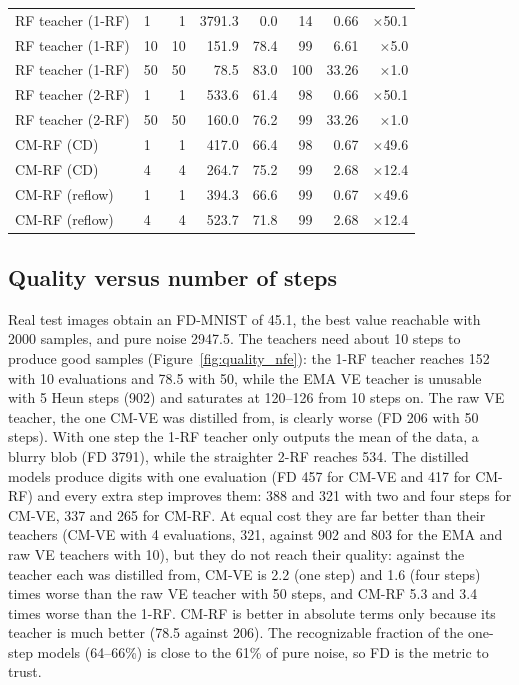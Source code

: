 \documentclass{article}
\begin{document}
\begin{table}[!htbp]
\begin{tabular}{llrrrrrr}
    RF teacher (1-RF) & 1 & 1 & 3791.3 & 0.0 & 14 & 0.66 & $\times$50.1 \\
    RF teacher (1-RF) & 10 & 10 & 151.9 & 78.4 & 99 & 6.61 & $\times$5.0 \\
    RF teacher (1-RF) & 50 & 50 & 78.5 & 83.0 & 100 & 33.26 & $\times$1.0 \\
    RF teacher (2-RF) & 1 & 1 & 533.6 & 61.4 & 98 & 0.66 & $\times$50.1 \\
    RF teacher (2-RF) & 50 & 50 & 160.0 & 76.2 & 99 & 33.26 & $\times$1.0 \\
    \midrule
    CM-RF (CD) & 1 & 1 & 417.0 & 66.4 & 98 & 0.67 & $\times$49.6 \\
    CM-RF (CD) & 4 & 4 & 264.7 & 75.2 & 99 & 2.68 & $\times$12.4 \\
    \midrule
    CM-RF (reflow) & 1 & 1 & 394.3 & 66.6 & 99 & 0.67 & $\times$49.6 \\
    CM-RF (reflow) & 4 & 4 & 523.7 & 71.8 & 99 & 2.68 & $\times$12.4 \\
    \bottomrule
  \end{tabular}
\end{table}

\subsection{Quality versus number of steps}

Real test images obtain an FD-MNIST of 45.1, the best value reachable with
2000 samples, and pure noise 2947.5. The teachers need about 10 steps to
produce good samples (Figure~\ref{fig:quality_nfe}): the 1-RF teacher reaches
152 with 10 evaluations and 78.5 with 50, while the EMA VE teacher is unusable
with 5 Heun steps (902) and saturates at 120--126 from 10 steps on. The raw VE
teacher, the one CM-VE was distilled from, is clearly worse (FD 206 with 50
steps). With one step the 1-RF teacher only outputs the mean of the data, a
blurry blob (FD 3791), while the straighter 2-RF reaches 534. The distilled
models produce digits with one evaluation (FD 457 for CM-VE and 417 for CM-RF)
and every extra step improves them: 388 and 321 with two and four steps for
CM-VE, 337 and 265 for CM-RF. At equal cost they are far better than their
teachers (CM-VE with 4 evaluations, 321, against 902 and 803 for the EMA and raw
VE teachers with 10), but they do not reach their quality: against the teacher
each was distilled from, CM-VE is 2.2 (one step) and 1.6 (four steps) times
worse than the raw VE teacher with 50 steps, and CM-RF 5.3 and 3.4 times worse
than the 1-RF. CM-RF is better in absolute terms only because its teacher is
much better (78.5 against 206). The recognizable fraction of the one-step
models (64--66\%) is close to the 61\% of pure noise, so FD is the metric to
trust.
\end{document}
